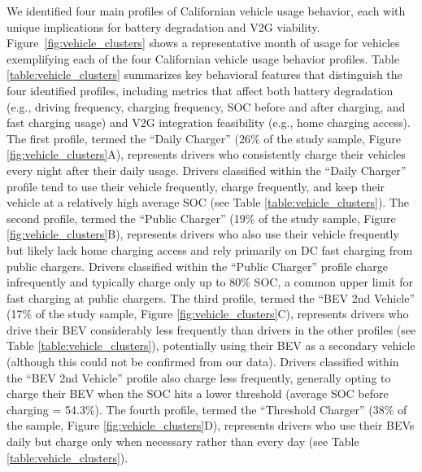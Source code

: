 \documentclass[pdflatex,sn-nature]{sn-jnl}%
\theoremstyle{thmstyleone}%
\theoremstyle{thmstyletwo}%
\theoremstyle{thmstylethree}%
\begin{document}
We identified four main profiles of Californian vehicle usage behavior, each with unique implications for battery degradation and V2G viability. Figure~\ref{fig:vehicle_clusters} shows a representative month of usage for vehicles exemplifying each of the four Californian vehicle usage behavior profiles. Table \ref{table:vehicle_clusters} summarizes key behavioral features that distinguish the four identified profiles, including metrics that affect both battery degradation (e.g., driving frequency, charging frequency, SOC before and after charging, and fast charging usage) and V2G integration feasibility (e.g., home charging access).
The first profile, termed the ``Daily Charger'' (26\% of the study sample, Figure \ref{fig:vehicle_clusters}A), represents drivers who consistently charge their vehicles every night after their daily usage. Drivers classified within the ``Daily Charger'' profile tend to use their vehicle frequently, charge frequently, and keep their vehicle at a relatively high average SOC (see Table \ref{table:vehicle_clusters}). The second profile, termed the ``Public Charger'' (19\% of the study sample, Figure \ref{fig:vehicle_clusters}B), represents drivers who also use their vehicle frequently but likely lack home charging access and rely primarily on DC fast charging from public chargers. Drivers classified within the ``Public Charger'' profile charge infrequently and typically charge only up to 80\% SOC, a common upper limit for fast charging at public chargers. The third profile, termed the ``BEV 2nd Vehicle'' (17\% of the study sample, Figure \ref{fig:vehicle_clusters}C), represents drivers who drive their BEV considerably less frequently than drivers in the other profiles (see Table \ref{table:vehicle_clusters}), potentially using their BEV as a secondary vehicle (although this could not be confirmed from our data). Drivers classified within the ``BEV 2nd Vehicle'' profile also charge less frequently, generally opting to charge their BEV when the SOC hits a lower threshold (average SOC before charging = 54.3\%). The fourth profile, termed the ``Threshold Charger'' (38\% of the sample, Figure \ref{fig:vehicle_clusters}D), represents drivers who use their BEVs daily but charge only when necessary rather than every day (see Table \ref{table:vehicle_clusters}).
\end{document}
